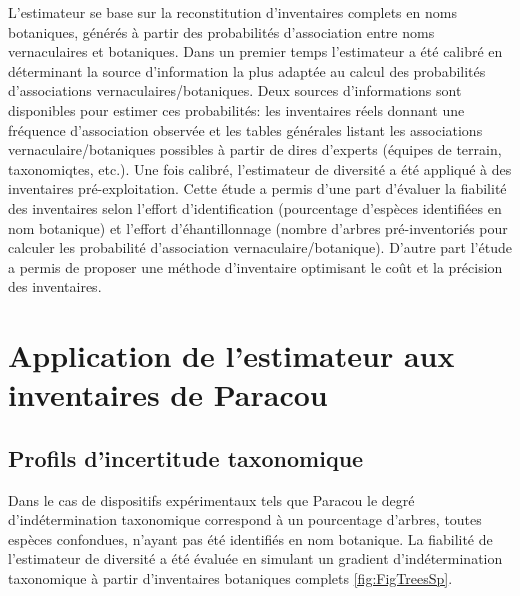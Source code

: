 \documentclass[
  11pt,
  french,
  A4paper,
  extrafontsizes,onecolumn,openright
  ]{memoir}
\begin{document}
L'estimateur se base sur la reconstitution d'inventaires complets en
noms botaniques, générés à partir des probabilités d'association entre
noms vernaculaires et botaniques. Dans un premier temps l'estimateur a
été calibré en déterminant la source d'information la plus adaptée au
calcul des probabilités d'associations vernaculaires/botaniques. Deux
sources d'informations sont disponibles pour estimer ces probabilités:
les inventaires réels donnant une fréquence d'association observée et
les tables générales listant les associations vernaculaire/botaniques
possibles à partir de dires d'experts (équipes de terrain, taxonomiqtes,
etc.). Une fois calibré, l'estimateur de diversité a été appliqué à des
inventaires pré-exploitation. Cette étude a permis d'une part d'évaluer
la fiabilité des inventaires selon l'effort d'identification
(pourcentage d'espèces identifiées en nom botanique) et l'effort
d'éhantillonnage (nombre d'arbres pré-inventoriés pour calculer les
probabilité d'association vernaculaire/botanique). D'autre part l'étude
a permis de proposer une méthode d'inventaire optimisant le coût et la
précision des inventaires.

\section{Application de l'estimateur aux inventaires de
Paracou}\label{application-de-lestimateur-aux-inventaires-de-paracou}

\subsection{Profils d'incertitude
taxonomique}\label{profils-dincertitude-taxonomique}

Dans le cas de dispositifs expérimentaux tels que Paracou le degré
d'indétermination taxonomique correspond à un pourcentage d'arbres,
toutes espèces confondues, n'ayant pas été identifiés en nom botanique.
La fiabilité de l'estimateur de diversité a été évaluée en simulant un
gradient d'indétermination taxonomique à partir d'inventaires botaniques
complets \ref{fig:FigTreesSp}.
\end{document}
